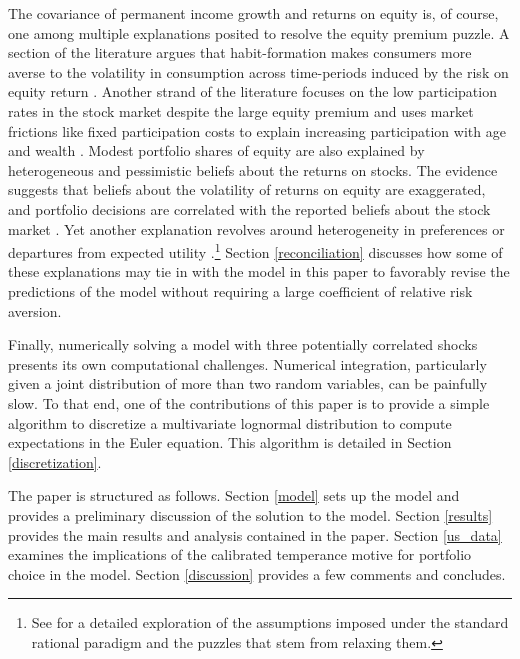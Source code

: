 The covariance of permanent income growth and returns on equity is, of course, one among multiple explanations posited to resolve the equity premium puzzle. A section of the literature argues that habit-formation makes consumers more averse to the volatility in consumption across time-periods induced by the risk on equity return \citep{Constantinides1990, Abel1990, Detemple1991, Campbell1999, Otrok2002}. Another strand of the literature focuses on the low participation rates in the stock market despite the large equity premium and uses market frictions like fixed participation costs to explain increasing participation with age and wealth \citep{Cocco2005, Gomes2005, Alan2006, Khorunzhina2013, Fagereng2017}. Modest portfolio shares of equity are also explained by heterogeneous and pessimistic beliefs about the returns on stocks. The evidence suggests that beliefs about the volatility of returns on equity are exaggerated, and portfolio decisions are correlated with the reported beliefs about the stock market \citep{Dominitz2007, Hurd2011, Amromin2014, Ameriks2020, Mateo2024}. Yet another explanation revolves around heterogeneity in preferences or departures from expected utility \citep{Guvenen2009,Haliassos1995,Haliassos2001, Routledge2010, Schreindorfer2020}.\footnote{See \citet{Barucci2003} for a detailed exploration of the assumptions imposed under the standard rational paradigm and the puzzles that stem from relaxing them.} Section \ref{reconciliation} discusses how some of these explanations may tie in with the model in this paper to favorably revise the predictions of the model without requiring a large coefficient of relative risk aversion.

Finally, numerically solving a model with three potentially correlated shocks presents its own computational challenges. Numerical integration, particularly given a joint distribution of more than two random variables, can be painfully slow. To that end, one of the contributions of this paper is to provide a simple algorithm to discretize a multivariate lognormal distribution to compute expectations in the Euler equation. This algorithm is detailed in Section \ref{discretization}.

The paper is structured as follows. Section \ref{model} sets up the model and provides a preliminary discussion of the solution to the model. Section \ref{results} provides the main results and analysis contained in the paper. Section \ref{us_data} examines the implications of the calibrated temperance motive for portfolio choice in the model. Section \ref{discussion} provides a few comments and concludes.
